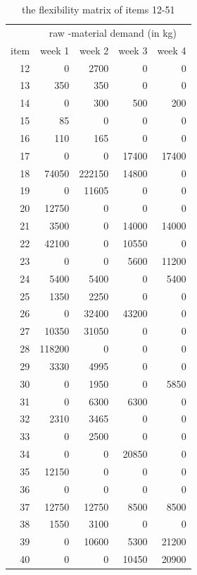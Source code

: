 \documentclass[preprint, 3p,
authoryear]{elsarticle} %
\begin{document}
\begin{table}[!h]

\caption{\label{tab:unnamed-chunk-8}the flexibility matrix of items 12-51}
\centering
\begin{tabular}[t]{r|r|r|r|r}
\hline
\multicolumn{1}{c|}{ } & \multicolumn{4}{c}{raw -material demand (in kg)} \\
\cline{2-5}
item & week 1 & week 2 & week 3 & week 4\\
\hline
12 & 0 & 2700 & 0 & 0\\
\hline
13 & 350 & 350 & 0 & 0\\
\hline
14 & 0 & 300 & 500 & 200\\
\hline
15 & 85 & 0 & 0 & 0\\
\hline
16 & 110 & 165 & 0 & 0\\
\hline
17 & 0 & 0 & 17400 & 17400\\
\hline
18 & 74050 & 222150 & 14800 & 0\\
\hline
19 & 0 & 11605 & 0 & 0\\
\hline
20 & 12750 & 0 & 0 & 0\\
\hline
21 & 3500 & 0 & 14000 & 14000\\
\hline
22 & 42100 & 0 & 10550 & 0\\
\hline
23 & 0 & 0 & 5600 & 11200\\
\hline
24 & 5400 & 5400 & 0 & 5400\\
\hline
25 & 1350 & 2250 & 0 & 0\\
\hline
26 & 0 & 32400 & 43200 & 0\\
\hline
27 & 10350 & 31050 & 0 & 0\\
\hline
28 & 118200 & 0 & 0 & 0\\
\hline
29 & 3330 & 4995 & 0 & 0\\
\hline
30 & 0 & 1950 & 0 & 5850\\
\hline
31 & 0 & 6300 & 6300 & 0\\
\hline
32 & 2310 & 3465 & 0 & 0\\
\hline
33 & 0 & 2500 & 0 & 0\\
\hline
34 & 0 & 0 & 20850 & 0\\
\hline
35 & 12150 & 0 & 0 & 0\\
\hline
36 & 0 & 0 & 0 & 0\\
\hline
37 & 12750 & 12750 & 8500 & 8500\\
\hline
38 & 1550 & 3100 & 0 & 0\\
\hline
39 & 0 & 10600 & 5300 & 21200\\
\hline
40 & 0 & 0 & 10450 & 20900\\

\end{tabular}
\end{table}
\end{document}
